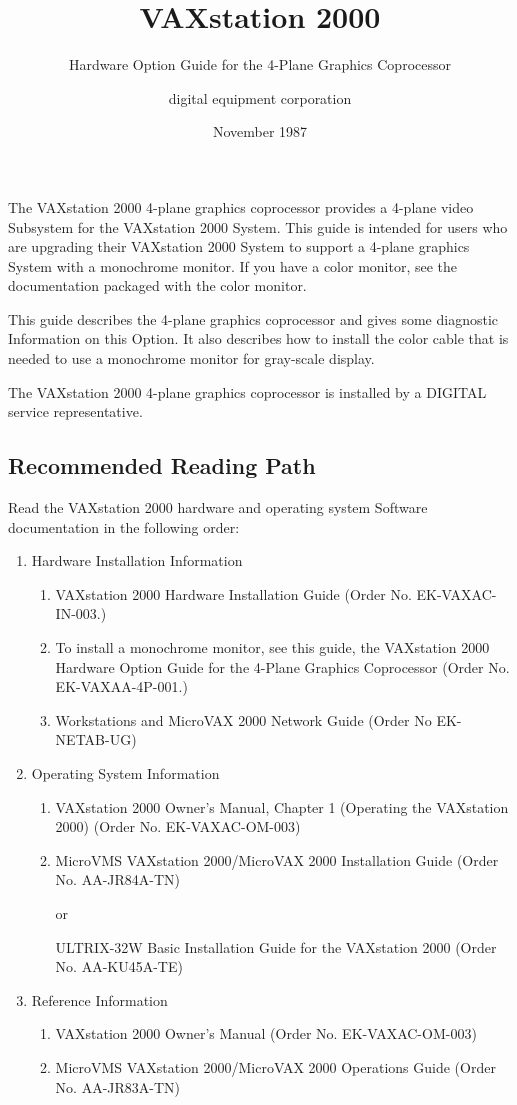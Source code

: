 \documentclass{dec}
\title{VAXstation 2000}
\subtitle{Hardware Option Guide for the 4-Plane Graphics Coprocessor}
\author{digital equipment corporation}
\date{November 1987}
\begin{document}
\maketitle

\toc

\newpage
{}
\thispagestyle{preface}
The VAXstation 2000 4-plane graphics coprocessor provides a 4-plane video
Subsystem for the VAXstation 2000 System. This guide is intended for
users who are upgrading their VAXstation 2000 System to support a 4-plane
graphics System with a monochrome monitor. If you have a color monitor,
see the documentation packaged with the color monitor.

This guide describes the 4-plane graphics coprocessor and gives some
diagnostic Information on this Option. It also describes how to install the color
cable that is needed to use a monochrome monitor for gray-scale display.

The VAXstation 2000 4-plane graphics coprocessor is installed by a DIGITAL
service representative.

\subsection*{Recommended Reading Path}
Read the VAXstation 2000 hardware and operating system Software documentation in the following order:
\begin{enumerate}
	\item Hardware Installation Information
	\begin{enumerate}
		\item VAXstation 2000 Hardware Installation Guide (Order No. EK-VAXAC-IN-003.)
		\item To install a monochrome monitor, see this guide, the VAXstation 2000 Hardware Option Guide for the 4-Plane Graphics Coprocessor (Order No.  EK-VAXAA-4P-001.)
		\item Workstations and MicroVAX 2000 Network Guide (Order No EK-NETAB-UG)
	\end{enumerate}
	\item Operating System Information
	\begin{enumerate}
		\item VAXstation 2000 Owner's Manual, Chapter 1 (Operating the VAXstation 2000) (Order No. EK-VAXAC-OM-003)
		\item MicroVMS VAXstation 2000/MicroVAX 2000 Installation Guide (Order No. AA-JR84A-TN)

				or

				ULTRIX-32W Basic Installation Guide for the VAXstation 2000 (Order No. AA-KU45A-TE)
	\end{enumerate}
	\item Reference Information
	\begin{enumerate}
		\item VAXstation 2000 Owner's Manual (Order No. EK-VAXAC-OM-003)
		\item MicroVMS VAXstation 2000/MicroVAX 2000 Operations Guide (Order No. AA-JR83A-TN)
	\end{enumerate}
\end{enumerate}
\end{document}
